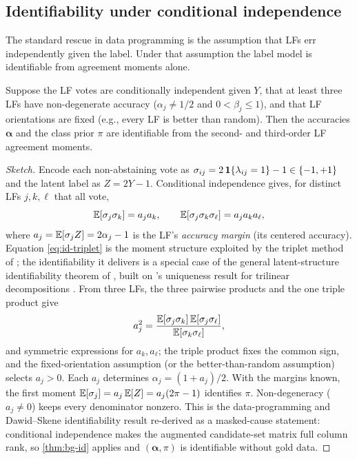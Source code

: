 \subsection{Identifiability under conditional independence}

The standard rescue in data programming is the assumption that LFs
err independently given the label. Under that assumption the label
model is identifiable from agreement moments alone.

\begin{theorem}
\label{thm:ci-identifiability}
Suppose the LF votes are conditionally independent given $Y$, that at
least three LFs have non-degenerate accuracy ($\alpha_j \neq 1/2$ and
$0 < \beta_j \le 1$), and that LF orientations are fixed (e.g., every
LF is better than random). Then the accuracies $\bm{\alpha}$ and the
class prior $\pi$ are identifiable from the second- and third-order
LF agreement moments.
\end{theorem}

\begin{proof}[Sketch]
Encode each non-abstaining vote as $\sigma_{ij} = 2\,\mathbf{1}\{\lambda_{ij}
= 1\} - 1 \in \{-1, +1\}$ and the latent label as $Z = 2Y - 1$.
Conditional independence gives, for distinct LFs $j, k, \ell$ that
all vote,
\begin{equation}
  \mathbb{E}[\sigma_j \sigma_k] = a_j a_k, \qquad
  \mathbb{E}[\sigma_j \sigma_k \sigma_\ell] = a_j a_k a_\ell,
  \label{eq:id-triplet}
\end{equation}
where $a_j = \mathbb{E}[\sigma_j Z] = 2\alpha_j - 1$ is the LF's
\emph{accuracy margin} (its centered accuracy). Equation
\eqref{eq:id-triplet} is the moment structure exploited by the
triplet method of \citet{fu2020fast}; the identifiability it delivers
is a special case of the general latent-structure identifiability
theorem of \citet{allman2009identifiability}, built on
\citeauthor{kruskal1977three}'s uniqueness result for trilinear
decompositions \citep{kruskal1977three}. From three LFs, the three
pairwise products and the one triple product give
\begin{equation}
  a_j^2 = \frac{\mathbb{E}[\sigma_j \sigma_k]\,\mathbb{E}[\sigma_j \sigma_\ell]}
               {\mathbb{E}[\sigma_k \sigma_\ell]},
  \label{eq:id-solve}
\end{equation}
and symmetric expressions for $a_k, a_\ell$; the triple product fixes
the common sign, and the fixed-orientation assumption (or the
better-than-random assumption) selects $a_j > 0$. Each $a_j$
determines $\alpha_j = (1 + a_j)/2$. With the margins known, the
first moment $\mathbb{E}[\sigma_j] = a_j\,\mathbb{E}[Z] = a_j(2\pi - 1)$ identifies
$\pi$. Non-degeneracy ($a_j \neq 0$) keeps every denominator nonzero.
This is the data-programming and Dawid--Skene identifiability result
\citep{dawid1979maximum,ratner2016data,fu2020fast} re-derived as a
masked-cause statement: conditional independence makes the augmented
candidate-set matrix full column rank, so \cref{thm:bg-id} applies
and $(\bm{\alpha}, \pi)$ is identifiable without gold data.
\end{proof}

